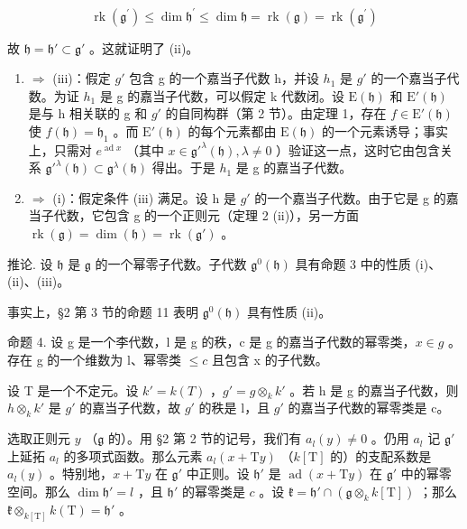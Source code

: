 \[
\operatorname{rk} \left(\mathfrak {g} ^ {\prime}\right) \leq \dim \mathfrak {h} ^ {\prime} \leq \dim \mathfrak {h} = \operatorname{rk} (\mathfrak {g}) = \operatorname{rk} \left(\mathfrak {g} ^ {\prime}\right)
\]

故 \(\mathfrak{h} = \mathfrak{h}'\subset \mathfrak{g}'\) 。这就证明了 (ii)。

\begin{enumerate}
\def\labelenumi{(\roman{enumi})}
\setcounter{enumi}{1}
\item
  \(\Longrightarrow\) (iii)：假定 \(g'\) 包含 g 的一个嘉当子代数 h，并设 \(h_{1}\) 是 \(g'\) 的一个嘉当子代数。为证 \(h_{1}\) 是 g 的嘉当子代数，可以假定 k 代数闭。设 \(\mathrm{E}(\mathfrak{h})\) 和 \(\mathrm{E}'(\mathfrak{h})\) 是与 h 相关联的 g 和 \(g'\) 的自同构群（第 2 节）。由定理 1，存在 \(f \in \mathrm{E}'(\mathfrak{h})\) 使 \(f(\mathfrak{h}) = \mathfrak{h}_{1}\) 。而 \(\mathrm{E}'(\mathfrak{h})\) 的每个元素都由 \(\mathrm{E}(\mathfrak{h})\) 的一个元素诱导；事实上，只需对 \(e^{\operatorname{ad} x}\) （其中 \(x \in \mathfrak{g}'^{\lambda}(\mathfrak{h}), \lambda \neq 0\) ）验证这一点，这时它由包含关系 \(\mathfrak{g}'^{\lambda}(\mathfrak{h}) \subset \mathfrak{g}^{\lambda}(\mathfrak{h})\) 得出。于是 \(h_{1}\) 是 g 的嘉当子代数。
\item
  \(\Longrightarrow\) (i)：假定条件 (iii) 满足。设 h 是 \(g'\) 的一个嘉当子代数。由于它是 g 的嘉当子代数，它包含 g 的一个正则元（定理 2 (ii)），另一方面 \(\operatorname{rk}(\mathfrak{g}) = \dim(\mathfrak{h}) = \operatorname{rk}(\mathfrak{g}')\) 。
\end{enumerate}

推论. 设 \(\mathfrak{h}\) 是 \(\mathfrak{g}\) 的一个幂零子代数。子代数 \(\mathfrak{g}^0 (\mathfrak{h})\) 具有命题 3 中的性质 (i)、(ii)、(iii)。

事实上，§2 第 3 节的命题 11 表明 \(\mathfrak{g}^0 (\mathfrak{h})\) 具有性质 (ii)。

命题 4. 设 g 是一个李代数，l 是 g 的秩，c 是 g 的嘉当子代数的幂零类，\(x \in g\) 。存在 g 的一个维数为 l、幂零类 \(\leq c\) 且包含 x 的子代数。

设 T 是一个不定元。设 \(k' = k(T)\) ，\(g' = g \otimes_k k'\) 。若 h 是 g 的嘉当子代数，则 \(h \otimes_k k'\) 是 \(g'\) 的嘉当子代数，故 \(g'\) 的秩是 l，且 \(g'\) 的嘉当子代数的幂零类是 c。

选取正则元 \(y\) （\(\mathfrak{g}\) 的）。用 §2 第 2 节的记号，我们有 \(a_l(y) \neq 0\) 。仍用 \(a_l\) 记 \(\mathfrak{g}'\) 上延拓 \(a_l\) 的多项式函数。那么元素 \(a_l(x + \mathrm{T}y)\) （\(k[\mathrm{T}]\) 的）的支配系数是 \(a_l(y)\) 。特别地，\(x + \mathrm{T}y\) 在 \(\mathfrak{g}'\) 中正则。设 \(\mathfrak{h}'\) 是 \(\operatorname{ad}(x + \mathrm{T}y)\) 在 \(\mathfrak{g}'\) 中的幂零空间。那么 \(\dim \mathfrak{h}' = l\) ，且 \(\mathfrak{h}'\) 的幂零类是 \(c\) 。设 \(\mathfrak{k} = \mathfrak{h}' \cap (\mathfrak{g} \otimes_k k[\mathrm{T}])\) ；那么 \(\mathfrak{k} \otimes_{k[\mathrm{T}]} k(\mathrm{T}) = \mathfrak{h}'\) 。

